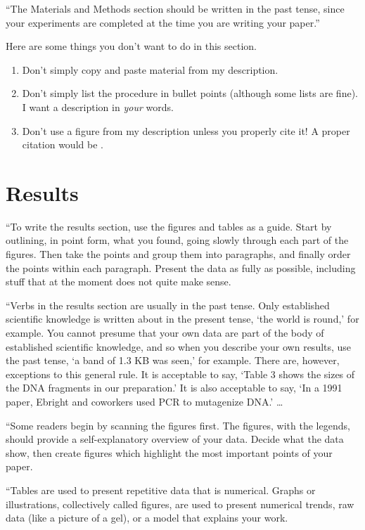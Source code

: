 \documentclass[10pt,twocolumn]{article}
\begin{document}
``The Materials and Methods section should be written in the past tense, since your experiments are completed at the time you are writing your paper.''

Here are some things you don't want to do in this section.

\begin{enumerate}
\item 
Don't simply copy and paste material from my description. 
\item 
Don't simply list the procedure in bullet points (although some lists are fine). I want a description in \emph{your} words.
\item
Don't use a figure from my description unless you properly cite it! A proper citation would be \citep[p.~32]{Picone2018}.
\end{enumerate}

\section{Results}
\label{sec:results}

``To write the results section, use the figures and tables as a guide. Start by outlining, in point form, what you found, going slowly through each part of the figures. Then take the points and group them into paragraphs, and finally order the points within each paragraph. Present the data as fully as possible, including stuff that at the moment does not quite make sense.

``Verbs in the results section are usually in the past tense. Only established scientific knowledge is written about in the present tense, `the world is round,' for example. You cannot presume that your own data are part of the body of established scientific knowledge, and so when you describe your own results, use the past tense, `a band of 1.3 KB was seen,' for example. There are, however, exceptions to this general rule. It is acceptable to say, `Table 3 shows the sizes of the DNA fragments in our preparation.' It is also acceptable to say, `In a 1991 paper, Ebright and coworkers used PCR to mutagenize DNA.' \ldots

``Some readers begin by scanning the figures first. The figures, with the legends, should provide a self-explanatory overview of your data. Decide what the data show, then create figures which highlight the most important points of your paper.

``Tables are used to present repetitive data that is numerical. Graphs or illustrations, collectively called figures, are used to present numerical trends, raw data (like a picture of a gel), or a model that explains your work.
\end{document}
